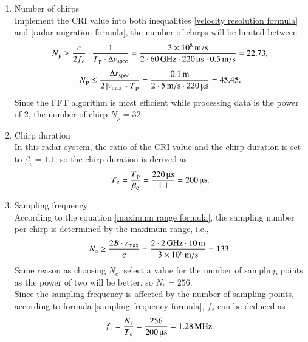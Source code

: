 \documentclass[12pt,DIV14,BCOR12mm,a4paper,footinclude=false,headinclude,parskip=half-,twoside,openright,cleardoublepage=empty,toc=index,bibliography=totoc,listof=totoc]{scrreprt}
\numberwithin{equation}{chapter}
\begin{document}
\begin{enumerate}
    \item Number of chirps\\
    Implement the CRI value into both inequalities \ref{velocity resolution formula} and \ref{radar migration formula}, the number of chirps will be limited between
    \begin{equation}
        \centering
        N\textsubscript{p} \geq \frac{c}{2f\textsubscript{c}} \cdot \frac{1}{T\textsubscript{p} \cdot \Delta v\textsubscript{spec}} = \frac{3 \times 10\textsuperscript{8}\,\mathrm{m/s}}{2\cdot 60\,\mathrm{GHz} \cdot 220\,\text{\textmu s} \cdot 0.5\,\mathrm{m/s}} = 22.73,
    \end{equation}
    \begin{equation}
        \centering
        N\textsubscript{p} \leq \frac{\Delta r\textsubscript{spec}}{2\left|v\textsubscript{max}\right| \cdot T\textsubscript{p}} = \frac{0.1\,\mathrm{m}}{2\cdot 5\,\mathrm{m/s} \cdot 220\,\text{\textmu s}} = 45.45.
    \end{equation}
    Since the FFT algorithm is most efficient while processing data is the power of 2, the number of chirp $N_p=32$.

    \item Chirp duration\\
    In this radar system, the ratio of the CRI value and the chirp duration is set to $\beta _c=1.1$, so the chirp duration is derived as
    \begin{equation}
        \centering
        T\textsubscript{c} = \frac{T\textsubscript{p}}{\beta \textsubscript{c}} = \frac{220\,\text{\textmu s}}{1.1} = 200\,\text{\textmu s}.
    \end{equation}

    \item Sampling frequency\\
    According to the equation \ref{maximum range formula}, the sampling number per chirp is determined by the maximum range,
    i.e.,
    \begin{equation}
        \centering
        N\textsubscript{s} \geq \frac{2B \cdot r\textsubscript{max}}{c} = \frac{2 \cdot 2\,\mathrm{GHz} \cdot 10\,\mathrm{m}}{3 \times 10\textsuperscript{8}\,\mathrm{m/s}} = 133.
    \end{equation}
    Same reason as choosing $N_c$, select a value for the number of sampling points as the power of two will be better, so $N_s=256$.\\
    Since the sampling frequency is affected by the number of sampling points, according to formula \ref{sampling frequency formula}, $f_s$ can be deduced as
    \begin{equation}
        \centering
        f\textsubscript{s} = \frac{N\textsubscript{s}}{T\textsubscript{c}} = \frac{256}{200\,\text{\textmu s}} = 1.28\,\mathrm{MHz}.
    \end{equation}
    
\end{enumerate}
\end{document}
